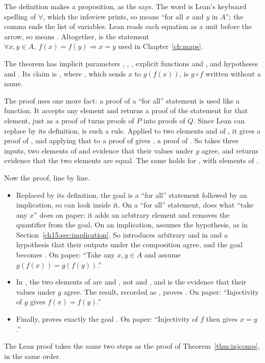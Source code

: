 The definition makes  a proposition, as the  says. The word  is Lean's keyboard spelling of $\forall$, which the infoview prints, so  means ``for all $x$ and $y$ in $A$''; the comma ends the list of variables. Lean reads each equation as a unit before the arrow, so  means . Altogether,  is the statement $\forall x,y\in A,\ f(x)=f(y)\Rightarrow x=y$ used in Chapter~\ref{ch:maps}.

The theorem has implicit parameters , , , explicit functions  and , and hypotheses  and . Its claim is , where , which sends $x$ to $g(f(x))$, is $g\circ f$ written without a name.

The proof uses one more fact: a proof of a ``for all'' statement is used like a function. It accepts any element and returns a proof of the statement for that element, just as a proof of  turns proofs of $P$ into proofs of $Q$. Since Lean can replace  by its definition,  is such a rule. Applied to two elements  and  of , it gives a proof of , and applying that to a proof  of  gives , a proof of . So  takes three inputs, two elements of  and evidence that their values under $g$ agree, and returns evidence that the two elements are equal. The same holds for , with elements of .

Now the proof, line by line.
\begin{itemize}
\item Replaced by its definition, the goal  is a ``for all'' statement followed by an implication, so  can look inside it. On a ``for all'' statement,  does what ``take any $x$'' does on paper: it adds an arbitrary element  and removes the quantifier from the goal. On an implication,  assumes the hypothesis, as in Section~\ref{ch15:sec:implication}. So  introduces arbitrary  and  in  and a hypothesis  that their outputs under the composition agree, and the goal becomes . On paper: ``Take any $x,y\in A$ and assume $g(f(x))=g(f(y))$.''
\item In , the two elements of  are  and , not  and , and  is the evidence that their values under $g$ agree. The result, recorded as , proves . On paper: ``Injectivity of $g$ gives $f(x)=f(y)$.''
\item Finally,  proves exactly the goal . On paper: ``Injectivity of $f$ then gives $x=y$.''
\end{itemize}
The Lean proof takes the same two steps as the proof of Theorem~\ref{thm:injcomp}, in the same order.

